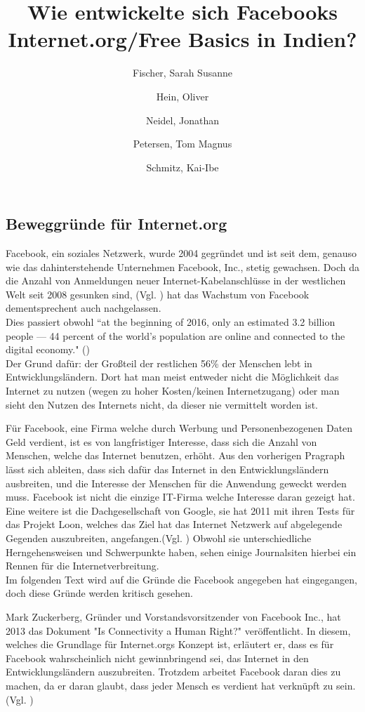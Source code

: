 \documentclass{article}
\title{Wie entwickelte sich Facebooks Internet.org/Free Basics in Indien?}
\author{
  Fischer, Sarah Susanne\\
  \and
  Hein, Oliver\\
  \and
  Neidel, Jonathan\\
  \and
  Petersen, Tom Magnus\\
  \and
  Schmitz, Kai-Ibe\\
}
\begin{document}
\subsection{Beweggründe für Internet.org}
Facebook, ein soziales Netzwerk, wurde 2004 gegründet und ist seit dem, genauso wie das dahinterstehende Unternehmen Facebook, Inc., stetig gewachsen. 
Doch da die Anzahl von Anmeldungen neuer Internet-Kabelanschlüsse in der westlichen Welt seit 2008 gesunken sind,
(Vgl. \cite{ICTslowingDown}) hat das Wachstum von Facebook dementsprechent auch nachgelassen.\\
Dies passiert obwohl ``at the beginning of 2016, only an estimated 3.2 billion people — 44 percent of the world’s population are online and connected to the digital economy." (\cite{connectWorld})\\
Der Grund dafür: der Großteil der restlichen 56\% der Menschen lebt in Entwicklungsländern. Dort hat man meist entweder nicht die Möglichkeit das Internet zu nutzen (wegen zu hoher Kosten/keinen Internetzugang) oder man sieht den Nutzen des Internets nicht, da dieser nie vermittelt worden ist.

\medskip

Für Facebook, eine Firma welche durch Werbung und Personenbezogenen Daten Geld verdient, ist es von langfristiger Interesse, dass sich die Anzahl von Menschen, welche das Internet benutzen, erhöht.
Aus den vorherigen Pragraph lässt sich ableiten, dass sich dafür das Internet in den Entwicklungsländern ausbreiten, und die Interesse der Menschen für die Anwendung geweckt werden muss.
Facebook ist nicht die einzige IT-Firma welche Interesse daran gezeigt hat.
Eine weitere ist die Dachgesellschaft von Google, sie hat 2011 mit ihren Tests für das Projekt Loon, welches das Ziel hat das Internet Netzwerk auf abgelegende Gegenden auszubreiten, angefangen.(Vgl. \cite{projectLoon})
Obwohl sie unterschiedliche Herngehensweisen und Schwerpunkte haben, sehen einige Journalsiten hierbei ein Rennen für die Internetverbreitung. \\
    
Im folgenden Text wird auf die Gründe die Facebook angegeben hat eingegangen, doch diese Gründe werden kritisch gesehen.   

\medskip
Mark Zuckerberg, Gründer und Vorstandsvorsitzender von Facebook Inc., hat 2013 das Dokument "Is Connectivity a Human Right?" veröffentlicht.
In diesem, welches die Grundlage für Internet.orgs Konzept ist, erläutert er, dass es für Facebook wahrscheinlich nicht gewinnbringend sei, das Internet in den Entwicklungsländern auszubreiten. Trotzdem arbeitet Facebook daran dies zu machen, da er daran glaubt, dass jeder Mensch es verdient hat verknüpft zu sein.(Vgl. \cite{HumanRight})
\end{document}
